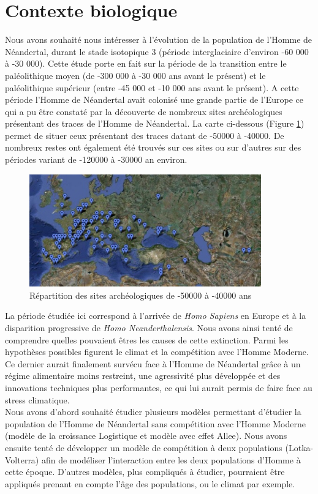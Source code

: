 \documentclass[a4paper,11pt]{article}
\begin{document}
\section{Contexte biologique}
	Nous avons souhaité nous intéresser à l'évolution de la population de l'Homme de Néandertal, durant le stade isotopique 3 (période interglaciaire d'environ -60 000 à -30 000). Cette étude porte en fait sur la période de la transition entre le paléolithique moyen (de -300 000 à -30 000 ans avant le présent) et  le paléolithique supérieur (entre -45 000 et -10 000 ans avant le présent). A cette période l'Homme de Néandertal avait colonisé une grande partie de l'Europe ce qui a pu être constaté par la découverte de nombreux sites archéologiques présentant des traces de l'Homme de Néandertal. La carte ci-dessous (Figure \ref{C1}) permet de situer ceux présentant des traces datant de -50000 à -40000. De nombreux restes ont également été trouvés sur ces sites ou sur d'autres sur des périodes variant de -120000 à -30000 an environ.\\ 
\begin{figure}[H]
	\centering
    \includegraphics[width=10cm]{SiteArche.jpg}
    \caption{Répartition des sites archéologiques de -50000 à -40000 ans}
    \label{C1}
\end{figure}
La période étudiée ici correspond à l'arrivée de \textit{Homo Sapiens} en Europe et à la disparition progressive de \textit{Homo Neanderthalensis}. Nous avons ainsi tenté de comprendre quelles pouvaient êtres les causes de cette extinction. Parmi les hypothèses possibles figurent le climat et la compétition avec l'Homme Moderne. Ce dernier aurait finalement survécu face à l'Homme de Néandertal grâce à un régime alimentaire moins restreint, une agressivité plus développée et des innovations techniques plus performantes, ce qui lui aurait permis de faire face au stress climatique.\\
Nous avons d'abord souhaité étudier plusieurs modèles permettant d'étudier la population de  l'Homme de Néandertal sans compétition avec l'Homme Moderne (modèle de la croissance Logistique et modèle avec effet Allee). Nous avons ensuite tenté de développer un modèle de compétition à deux populations (Lotka-Volterra) afin de modéliser l'interaction entre les deux populations d'Homme à cette époque. D'autres modèles, plus compliqués à étudier, pourraient être appliqués prenant en compte l'âge des populations, ou le  climat par exemple.
\end{document}
